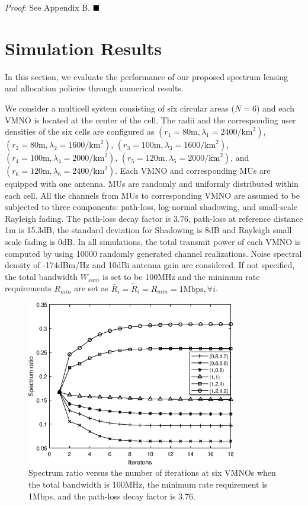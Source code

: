 \documentclass[journal]{IEEEtran}
\begin{document}
\textit{Proof}: See Appendix B.  $\hfill\blacksquare$
\section{Simulation Results}
In this section, we evaluate the performance of our proposed spectrum leasing and allocation policies through numerical results. 

We consider a multicell system consisting of six circular areas ($N = 6$) and each VMNO is located at the center of the cell. The radii and the corresponding user densities of the six cells are configured as $(r_1 = 80\mbox{m}, \lambda_1 = 2400/\mbox{km}^2)$, $(r_2 = 80\mbox{m}, \lambda_2 = 1600/\mbox{km}^2)$, $(r_3 = 100\mbox{m}, \lambda_3 = 1600/\mbox{km}^2)$, $(r_4 = 100\mbox{m}, \lambda_4 = 2000/\mbox{km}^2)$, $(r_5 = 120\mbox{m}, \lambda_5 = 2000/\mbox{km}^2)$, and $(r_6 = 120\mbox{m}, \lambda_6 = 2400/\mbox{km}^2)$. Each VMNO and corresponding MUs are equipped with one antenna. MUs are randomly and uniformly distributed within each cell. All the channels from MUs to corresponding VMNO are assumed to be subjected to three components: path-loss, log-normal shadowing, and small-scale Rayleigh fading. The path-loss decay factor is 3.76, 
path-loss at reference distance 1m is 15.3dB, the standard deviation for Shadowing is 8dB and Rayleigh small scale fading is 0dB. In all simulations, the total transmit power of each VMNO is computed by using 10000 randomly generated channel realizations. Noise spectral density of -174dBm/Hz and 10dBi antenna gain are considered. If not specified, the total bandwidth $W_{sum}$ is set to be 100MHz and the minimum rate requirements $R_{min}$ are set as $\bar{R}_i = \tilde{R}_i = R_{min} = 1\mbox{Mbps}, \forall i$.


\begin{figure}
	\centering
	\includegraphics[width=3.6in]{SR_convergence.eps}
	\caption{Spectrum ratio versus the number of iterations at six VMNOs when the total bandwidth is 100MHz, the minimum rate requirement is 1Mbps, and the path-loss decay factor is 3.76.}
\end{figure}
\end{document}
